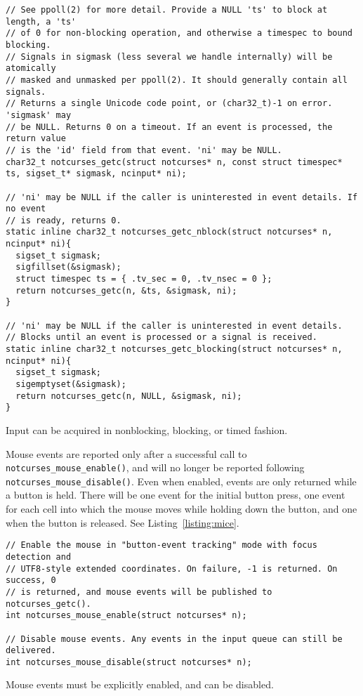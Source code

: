 \begin{listing}[!htb]
\begin{verbatim}
// See ppoll(2) for more detail. Provide a NULL 'ts' to block at length, a 'ts'
// of 0 for non-blocking operation, and otherwise a timespec to bound blocking.
// Signals in sigmask (less several we handle internally) will be atomically
// masked and unmasked per ppoll(2). It should generally contain all signals.
// Returns a single Unicode code point, or (char32_t)-1 on error. 'sigmask' may
// be NULL. Returns 0 on a timeout. If an event is processed, the return value
// is the 'id' field from that event. 'ni' may be NULL.
char32_t notcurses_getc(struct notcurses* n, const struct timespec* ts, sigset_t* sigmask, ncinput* ni);

// 'ni' may be NULL if the caller is uninterested in event details. If no event
// is ready, returns 0.
static inline char32_t notcurses_getc_nblock(struct notcurses* n, ncinput* ni){
  sigset_t sigmask;
  sigfillset(&sigmask);
  struct timespec ts = { .tv_sec = 0, .tv_nsec = 0 };
  return notcurses_getc(n, &ts, &sigmask, ni);
}

// 'ni' may be NULL if the caller is uninterested in event details.
// Blocks until an event is processed or a signal is received.
static inline char32_t notcurses_getc_blocking(struct notcurses* n, ncinput* ni){
  sigset_t sigmask;
  sigemptyset(&sigmask);
  return notcurses_getc(n, NULL, &sigmask, ni);
}
\end{verbatim}
\caption{Input can be acquired in nonblocking, blocking, or timed fashion.}
\label{listing:input}
\end{listing}

Mouse events are reported only after a successful call to
\texttt{notcurses\_mouse\_enable()}, and will no longer be reported following
\texttt{notcurses\_mouse\_disable()}. Even when enabled, events are only
returned while a button is held. There will be one event for the initial button
press, one event for each cell into which the mouse moves while holding down
the button, and one when the button is released. See Listing~\ref{listing:mice}.

\begin{listing}[!htb]
\begin{verbatim}
// Enable the mouse in "button-event tracking" mode with focus detection and
// UTF8-style extended coordinates. On failure, -1 is returned. On success, 0
// is returned, and mouse events will be published to notcurses_getc().
int notcurses_mouse_enable(struct notcurses* n);

// Disable mouse events. Any events in the input queue can still be delivered.
int notcurses_mouse_disable(struct notcurses* n);
\end{verbatim}
\caption{Mouse events must be explicitly enabled, and can be disabled.}
\label{listing:mice}
\end{listing}

